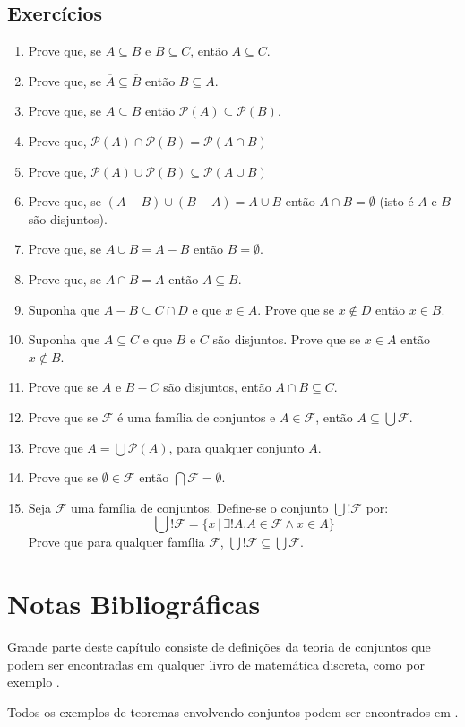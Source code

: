 \subsection{Exercícios}

\begin{enumerate}
	\item Prove que, se $A\subseteq B$ e $B\subseteq C$, ent\~ao $A\subseteq C$.
	\item Prove que, se $\overline{A}\subseteq\overline{B}$ ent\~ao $B\subseteq{A}$.
	\item Prove que, se $A\subseteq B$ ent\~ao $\mathcal{P}(A)\subseteq\mathcal{P}(B)$.
	\item Prove que, $\mathcal{P}(A)\cap\mathcal{P}(B)=\mathcal{P}(A\cap B)$
	\item Prove que, $\mathcal{P}(A)\cup\mathcal{P}(B)\subseteq\mathcal{P}(A\cup B)$
	\item Prove que, se $(A - B)\cup (B - A) = A\cup B$ ent\~ao $A\cap B =\emptyset$ (isto \'e $A$ e $B$ s\~ao disjuntos).
	\item Prove que, se $A \cup B = A - B$ ent\~ao $B=\emptyset$.
	\item Prove que, se $A\cap B = A$ ent\~ao $A\subseteq B$.
	\item Suponha que $A - B \subseteq C\cap D$ e que $x\in A$. Prove que se $x\not\in D$ ent\~ao $x\in B$.
	\item Suponha que $A\subseteq C$ e que $B$ e $C$ s\~ao disjuntos. Prove que se $x\in A$ ent\~ao $x\not\in B$.
	\item Prove que se $A$ e $B - C$ s\~ao disjuntos, ent\~ao $A\cap B\subseteq C$.
	\item Prove que se $\mathcal{F}$ \'e uma fam\'ilia de conjuntos e $A\in\mathcal{F}$, ent\~ao
	      $A\subseteq\bigcup\mathcal{F}$.
	\item Prove que $A=\bigcup\mathcal{P}(A)$, para qualquer conjunto
          $A$.
       \item Prove que se $\emptyset\in\mathcal{F}$ ent\~ao
         $\bigcap\mathcal{F} = \emptyset$.
       \item    Seja $\mathcal{F}$ uma fam\'ilia de conjuntos. Define-se o conjunto $\bigcup
  ! \mathcal{F}$ por: \[\bigcup ! \mathcal{F} = \{x\,|\,\exists ! A. A\in
    \mathcal{F}\land x\in A\}\]
 Prove que para qualquer fam\'ilia $\mathcal{F}$, $\bigcup
         !\mathcal{F}\subseteq \bigcup\mathcal{F}$.
\end{enumerate}

\section{Notas Bibliográficas}

Grande parte deste capítulo consiste de definições da teoria de
conjuntos que podem ser encontradas em qualquer livro de matemática
discreta, como por exemplo \cite{Velleman06}.

Todos os exemplos de teoremas envolvendo conjuntos podem ser
encontrados em \cite{Velleman06}.